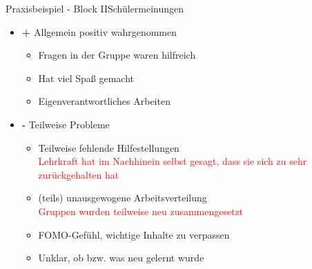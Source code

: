 \documentclass{beamer}
\newcommand{\teacher}[1]{\textcolor{red}{#1}}
\newcommand{\ppause}{}
\begin{document}
	\begin{frame}[t]{Praxisbeispiel - Block II}{Schülermeinungen}
		\begin{itemize}
			\ppause
			\item \textcolor{darkgreen}{\textbf{+}} Allgemein positiv wahrgenommen
			\ppause
			\begin{itemize}
				\item Fragen in der Gruppe waren hilfreich
				\ppause
				\item Hat viel Spaß gemacht
				\ppause
				\item Eigenverantwortliches Arbeiten
				\ppause
			\end{itemize}
			
			\item \textcolor{red}{\textbf{-}} Teilweise Probleme
			\ppause
			\begin{itemize}
				\item Teilweise fehlende Hilfestellungen\\
				\teacher{Lehrkraft hat im Nachhinein selbst gesagt, dass sie sich zu sehr zurückgehalten hat}
				\ppause
				\item (teils) unausgewogene Arbeitsverteilung\\
				\teacher{Gruppen wurden teilweise neu zusammengesetzt}
				\ppause
				\item FOMO-Gefühl, wichtige Inhalte zu verpassen
				\ppause
				\item Unklar, ob bzw. was neu gelernt wurde
			\end{itemize}
		\end{itemize}
	\end{frame}
	
\end{document}
